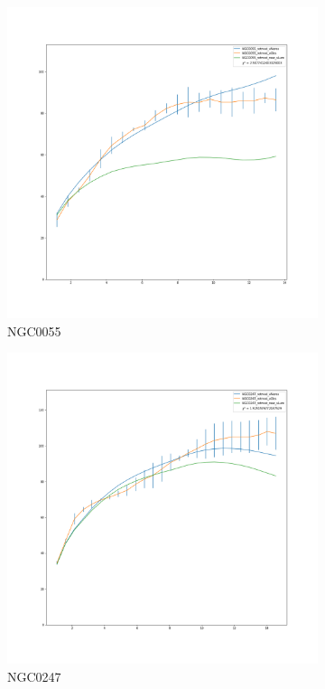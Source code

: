 \documentclass[reprint,%
 amsmath,amssymb,
 aps,
]{revtex4-1}
\begin{document}
\begin{figure}[h]
\begin{subfigure}{.5\textwidth}
  \centering
  \includegraphics[width=.8\linewidth]{figures/NGC0055_rotmod_XueSofue.png}
  \caption{NGC0055}
  \label{fig:sfig7}
\end{subfigure}
\begin{subfigure}{.5\textwidth}
  \centering
  \includegraphics[width=.8\linewidth]{figures/NGC0247_rotmod_XueSofue.png}
  \caption{NGC0247}
  \label{fig:sfig8}
\end{subfigure}
\begin{subfigure}{.5\textwidth}
  \centering

\end{subfigure}
\end{figure}
\end{document}
